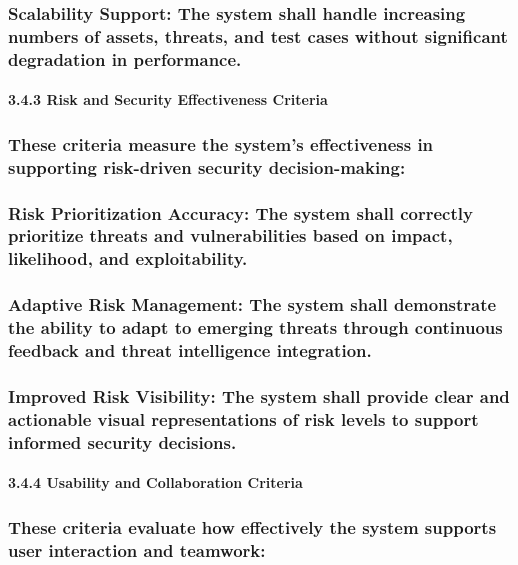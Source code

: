 \documentclass[12pt,a4paper]{report}
\begin{document}
\subsubsection{Scalability Support: The system shall handle increasing numbers of assets, threats, and test cases without significant degradation in performance.}

\paragraph{3.4.3 Risk and Security Effectiveness Criteria}

\subsubsection{These criteria measure the system’s effectiveness in supporting risk-driven security decision-making:}

\subsubsection{Risk Prioritization Accuracy: The system shall correctly prioritize threats and vulnerabilities based on impact, likelihood, and exploitability.}

\subsubsection{Adaptive Risk Management: The system shall demonstrate the ability to adapt to emerging threats through continuous feedback and threat intelligence integration.}

\subsubsection{Improved Risk Visibility: The system shall provide clear and actionable visual representations of risk levels to support informed security decisions.}

\paragraph{3.4.4 Usability and Collaboration Criteria}

\subsubsection{These criteria evaluate how effectively the system supports user interaction and teamwork:}
\end{document}
